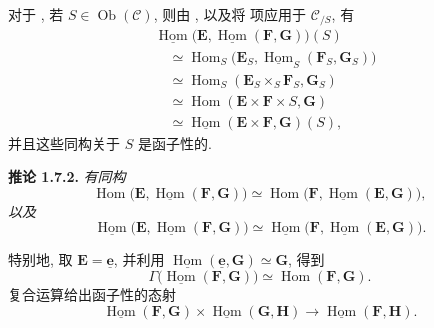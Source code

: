 对于 , 若
\(S\in\operatorname{Ob}(\mathscr C)\), 则由
, 以及将
 项应用于 \(\mathscr C_{/S}\), 有
\begin{align*}
  &\underline{\operatorname{Hom}}
    \bigl(\mathbf E,
      \underline{\operatorname{Hom}}(\mathbf F,\mathbf G)\bigr)(S)\\
  &\quad\simeq
    \operatorname{Hom}_S
      \bigl(\mathbf E_S,
        \underline{\operatorname{Hom}}_S(\mathbf F_S,\mathbf G_S)\bigr)\\
  &\quad\simeq
    \operatorname{Hom}_S
      (\mathbf E_S\times_S\mathbf F_S,\mathbf G_S)\\
  &\quad\simeq
    \operatorname{Hom}(\mathbf E\times\mathbf F\times S,\mathbf G)\\
  &\quad\simeq
    \underline{\operatorname{Hom}}
      (\mathbf E\times\mathbf F,\mathbf G)(S),
\end{align*}
并且这些同构关于 \(S\) 是函子性的.

\medskip
\noindent{}\textbf{推论 1.7.2.}
\textit{有同构
\[
  \operatorname{Hom}
    \bigl(\mathbf E,
      \underline{\operatorname{Hom}}(\mathbf F,\mathbf G)\bigr)
    \simeq
  \operatorname{Hom}
    \bigl(\mathbf F,
      \underline{\operatorname{Hom}}(\mathbf E,\mathbf G)\bigr),
\]
以及
\[
  \underline{\operatorname{Hom}}
    \bigl(\mathbf E,
      \underline{\operatorname{Hom}}(\mathbf F,\mathbf G)\bigr)
    \simeq
  \underline{\operatorname{Hom}}
    \bigl(\mathbf F,
      \underline{\operatorname{Hom}}(\mathbf E,\mathbf G)\bigr).
\]}

特别地, 取 \(\mathbf E=\underline{\mathbf e}\), 并利用
\(\underline{\operatorname{Hom}}(\underline{\mathbf e},\mathbf G)
\simeq\mathbf G\), 得到
\[
  \Gamma\bigl(\underline{\operatorname{Hom}}(\mathbf F,\mathbf G)\bigr)
    \simeq\operatorname{Hom}(\mathbf F,\mathbf G).
\]
复合运算给出函子性的态射
\[
  \underline{\operatorname{Hom}}(\mathbf F,\mathbf G)
    \times
  \underline{\operatorname{Hom}}(\mathbf G,\mathbf H)
    \longrightarrow
  \underline{\operatorname{Hom}}(\mathbf F,\mathbf H).
\]

